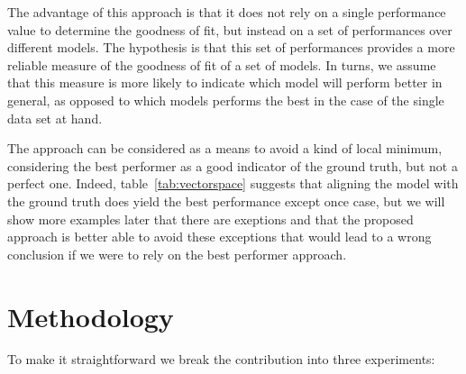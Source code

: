 The advantage of this approach is that it does not rely on a single performance value to determine the goodness of fit, but instead on a set of performances over different models.  The hypothesis is that this set of performances provides a more reliable measure of the goodness of fit of a set of models.  In turns, we assume that this measure is more likely to indicate which model will perform better in general, as opposed to which models performs the best in the case of the single data set at hand.  

The approach can be considered as a means to avoid a kind of local minimum, considering the best performer as a good indicator of the ground truth, but not a perfect one. Indeed, table~\ref{tab:vectorspace} suggests that aligning the model with the ground truth does yield the best performance except once case, but we will show more examples later that there are exeptions and that the proposed approach is better able to avoid these exceptions that would lead to a wrong conclusion if we were to rely on the best performer approach.


\section{Methodology}
To make it straightforward we break the contribution into three experiments:

